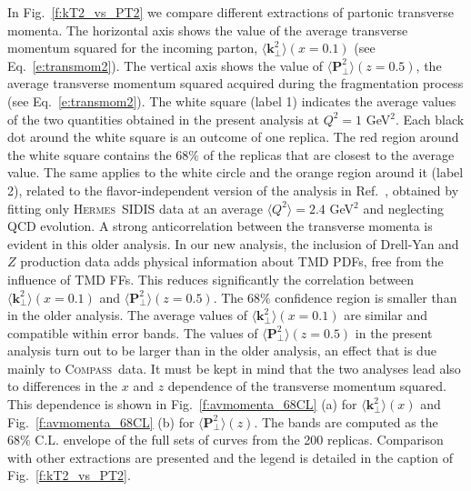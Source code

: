 \documentclass[aps,preprintnumbers,showpacs,nofootinbib,superscriptaddress,floatfix]{revtex4}
\newcommand{\hermes}{\textsc{Hermes}}
\newcommand{\compass}{\textsc{Compass}}
\newcommand{\T}{\perp}
\begin{document}
In Fig.~\ref{f:kT2_vs_PT2} we compare different extractions of
partonic transverse momenta. The horizontal axis shows 
the value of the average transverse
momentum squared for the incoming parton, $\big \langle \bm{k}_{\T}^2 \big \rangle (x=0.1)$ (see Eq.~\eqref{e:transmom2}). 
The vertical axis shows the value of $\big \langle \bm{P}_{\perp}^2 \big \rangle (z=0.5)$, 
the average transverse momentum squared acquired during the fragmentation process (see Eq.~\eqref{e:transmom2}).  
The white square (label 1) indicates the average values of the two quantities
obtained in the present analysis at $Q^2=1$ GeV$^2$.
Each black dot around the white square is an outcome of one replica. The red
region around the white square contains the $68\%$ of the replicas that are closest to the average value.
The same applies to the white circle and the orange region around it (label 2),
related to the flavor-independent version of the analysis in
Ref.~\cite{Signori:2013mda}, obtained by fitting only \hermes\ SIDIS
data at an average $\langle Q^2 \rangle= 2.4$ GeV$^2$ and neglecting QCD evolution. 
A strong anticorrelation between the transverse momenta is evident in this
older analysis. 
In our new analysis, the inclusion of Drell-Yan and $Z$ production data adds physical information
about TMD PDFs, free from the influence of TMD FFs. This reduces significantly the 
correlation between $\big \langle \bm{k}_{\T}^2 \big \rangle (x=0.1)$ and $\big \langle \bm{P}_{\perp}^2 \big \rangle (z=0.5)$.  
The $68\%$ confidence region is smaller than in the older analysis. 
The average values of $\big \langle \bm{k}_{\T}^2 \big \rangle (x=0.1)$ are similar and compatible within error bands. 
The values of $\big \langle \bm{P}_{\perp}^2 \big \rangle (z=0.5)$ in the present analysis
turn out to be larger than in the older analysis, an effect that is due mainly to \compass\ data.
It must be kept in mind that the two analyses lead also to differences in the $x$ and
$z$ dependence of the transverse momentum squared. 
This dependence is shown in Fig.~\ref{f:avmomenta_68CL} (a) for $\big
\langle \bm{k}_{\T}^2 \big \rangle (x)$ and Fig.~\ref{f:avmomenta_68CL} (b)
for $\big \langle \bm{P}_{\perp}^2 \big \rangle (z)$. 
The bands are computed as the $68\%$ C.L.  envelope of the full sets of curves from the 200 replicas. Comparison with other extractions are presented and the legend is detailed in the caption of Fig.~\ref{f:kT2_vs_PT2}.
\end{document}
